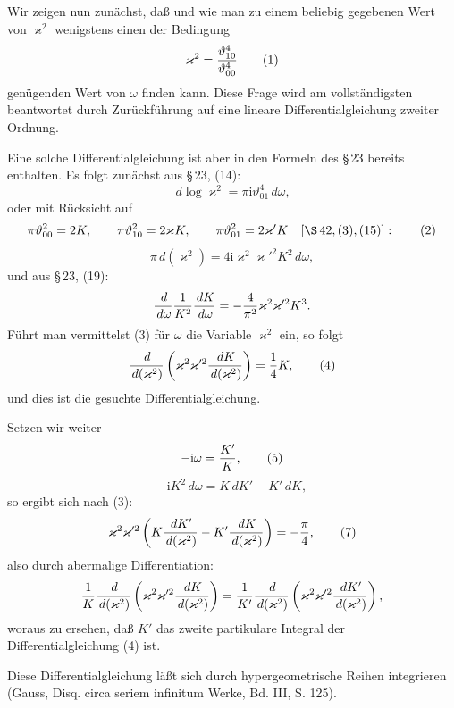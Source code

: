 \documentclass[11pt]{article}
\providecommand{\dd}{\,d}
\providecommand{\tht}{\vartheta}
\providecommand{\ii}{\mathrm{i}}
\begin{document}
Wir zeigen nun zunächst, daß und wie man zu einem beliebig gegebenen Wert von $\varkappa^2$ wenigstens einen der Bedingung
\begin{equation}
\varkappa^2={\tht_{10}^4\over\tht_{00}^4}
\tag{1}
\end{equation}
genügenden Wert von $\omega$ finden kann. Diese Frage wird am vollständigsten beantwortet durch Zurückführung auf eine lineare Differentialgleichung zweiter Ordnung.

Eine solche Differentialgleichung ist aber in den Formeln des \S\,23 bereits enthalten. Es folgt zunächst aus \S\,23, (14):
\[
\dd\log\varkappa^2=\pi\ii\tht_{01}^4\dd\omega,
\]
oder mit Rücksicht auf
\begin{equation}
\pi\tht_{00}^2=2K,
\qquad
\pi\tht_{10}^2=2\varkappa K,
\qquad
\pi\tht_{01}^2=2\varkappa'K
\quad[\S\,42,(3),(15)]:
\tag{2}
\end{equation}
\begin{equation}
\pi\dd(\varkappa^2)=4\ii\varkappa^2\varkappa'^2K^2\dd\omega,
\tag{3}
\end{equation}
und aus \S\,23, (19):
\[
{\dd\over\dd\omega}{1\over K^2}{\dd K\over\dd\omega}
=-{4\over\pi^2}\varkappa^2\varkappa'^2K^3.
\]
Führt man vermittelst (3) für $\omega$ die Variable $\varkappa^2$ ein, so folgt
\begin{equation}
{\dd\over\dd(\varkappa^2)}
\left(\varkappa^2\varkappa'^2{\dd K\over\dd(\varkappa^2)}\right)
={1\over4}K,
\tag{4}
\end{equation}
und dies ist die gesuchte Differentialgleichung.

Setzen wir weiter
\begin{equation}
-\ii\omega={K'\over K},
\tag{5}
\end{equation}
\begin{equation}
-\ii K^2\dd\omega=K\dd K'-K'\dd K,
\tag{6}
\end{equation}
so ergibt sich nach (3):
\begin{equation}
\varkappa^2\varkappa'^2\left(K{\dd K'\over\dd(\varkappa^2)}-K'{\dd K\over\dd(\varkappa^2)}\right)=-{\pi\over4},
\tag{7}
\end{equation}
also durch abermalige Differentiation:
\[
{1\over K}{\dd\over\dd(\varkappa^2)}
\left(\varkappa^2\varkappa'^2{\dd K\over\dd(\varkappa^2)}\right)
={1\over K'}{\dd\over\dd(\varkappa^2)}
\left(\varkappa^2\varkappa'^2{\dd K'\over\dd(\varkappa^2)}\right),
\]
woraus zu ersehen, daß $K'$ das zweite partikulare Integral der Differentialgleichung (4) ist.

Diese Differentialgleichung läßt sich durch hypergeometrische Reihen integrieren (Gauss, Disq. circa seriem infinitum Werke, Bd. III, S. 125).
\end{document}
